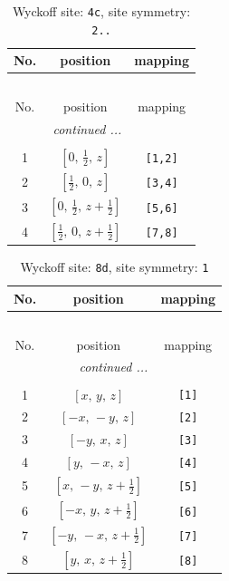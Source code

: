 \documentclass[fleqn,8pt]{jsarticle}
\begin{document}
\renewcommand{\arraystretch}{1.2}
\begin{longtable}{ccc}
\caption{Wyckoff site: {\tt 4c}, site symmetry: {\tt 2..}}
 \\
 \hline \hline
No. & position & mapping \\ \hline \endfirsthead

\multicolumn{2}{l}{\tablename\ \thetable{}} \\
 \hline \hline
No. & position & mapping \\ \hline \endhead

 \hline \hline
\multicolumn{2}{r}{\footnotesize\it continued ...} \\ \endfoot

 \hline \hline
\multicolumn{2}{r}{} \\ \endlastfoot

1 & $\left[ 0,\, \frac{1}{2},\, z \right]$ & {\tt [1,2]} \\ \hline
2 & $\left[ \frac{1}{2},\, 0,\, z \right]$ & {\tt [3,4]} \\ \hline
3 & $\left[ 0,\, \frac{1}{2},\, z + \frac{1}{2} \right]$ & {\tt [5,6]} \\ \hline
4 & $\left[ \frac{1}{2},\, 0,\, z + \frac{1}{2} \right]$ & {\tt [7,8]} \\
\end{longtable}
\renewcommand{\arraystretch}{1.2}
\begin{longtable}{ccc}
\caption{Wyckoff site: {\tt 8d}, site symmetry: {\tt 1}}
 \\
 \hline \hline
No. & position & mapping \\ \hline \endfirsthead

\multicolumn{2}{l}{\tablename\ \thetable{}} \\
 \hline \hline
No. & position & mapping \\ \hline \endhead

 \hline \hline
\multicolumn{2}{r}{\footnotesize\it continued ...} \\ \endfoot

 \hline \hline
\multicolumn{2}{r}{} \\ \endlastfoot

1 & $\left[ x,\, y,\, z \right]$ & {\tt [1]} \\ \hline
2 & $\left[ - x,\, - y,\, z \right]$ & {\tt [2]} \\ \hline
3 & $\left[ - y,\, x,\, z \right]$ & {\tt [3]} \\ \hline
4 & $\left[ y,\, - x,\, z \right]$ & {\tt [4]} \\ \hline
5 & $\left[ x,\, - y,\, z + \frac{1}{2} \right]$ & {\tt [5]} \\ \hline
6 & $\left[ - x,\, y,\, z + \frac{1}{2} \right]$ & {\tt [6]} \\ \hline
7 & $\left[ - y,\, - x,\, z + \frac{1}{2} \right]$ & {\tt [7]} \\ \hline
8 & $\left[ y,\, x,\, z + \frac{1}{2} \right]$ & {\tt [8]} \\
\end{longtable}
\end{document}
